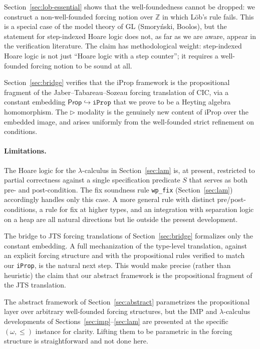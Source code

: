 \documentclass[11pt]{article}
\begin{document}
Section~\ref{sec:lob-essential} shows that the well-foundedness
cannot be dropped: we construct a non-well-founded forcing notion
over $\mathbb{Z}$ in which Löb's rule fails. This is a special case
of the model theory of \textsf{GL} (Smoryński, Boolos), but the
statement for step-indexed Hoare logic does not, as far as we are
aware, appear in the verification literature. The claim has
methodological weight: step-indexed Hoare logic is not just
``Hoare logic with a step counter''; it requires a well-founded
forcing notion to be sound at all.

Section~\ref{sec:bridge} verifies that the iProp framework is the
propositional fragment of the Jaber--Tabareau--Sozeau forcing
translation of CIC, via a constant embedding
$\mathsf{Prop} \hookrightarrow \mathtt{iProp}$ that we prove to be
a Heyting algebra homomorphism. The $\triangleright$ modality is
the genuinely new content of iProp over the embedded image, and
arises uniformly from the well-founded strict refinement on
conditions.

\paragraph{Limitations.}
The Hoare logic for the $\lambda$-calculus in
Section~\ref{sec:lam} is, at present, restricted to partial
correctness against a single specification predicate $S$ that
serves as both pre- and post-condition. The fix soundness rule
\texttt{wp\_fix} (Section~\ref{sec:lam}) accordingly handles only
this case. A more general rule with distinct pre/post-conditions, a
rule for fix at higher types, and an integration with separation
logic on a heap are all natural directions but lie outside the
present development.

The bridge to JTS forcing translations of Section~\ref{sec:bridge}
formalizes only the constant embedding. A full mechanization of the
type-level translation, against an explicit forcing structure and
with the propositional rules verified to match our \texttt{iProp},
is the natural next step. This would make precise (rather than
heuristic) the claim that our abstract framework is the
propositional fragment of the JTS translation.

The abstract framework of Section~\ref{sec:abstract} parametrizes
the propositional layer over arbitrary well-founded forcing
structures, but the IMP and $\lambda$-calculus developments of
Sections~\ref{sec:imp}--\ref{sec:lam} are presented at the
specific $(\omega, \le)$ instance for clarity. Lifting them to be
parametric in the forcing structure is straightforward and not
done here.
\end{document}
